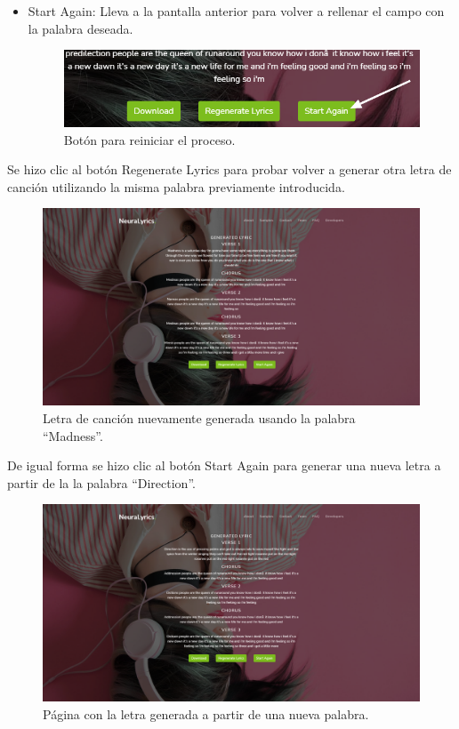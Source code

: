 \documentclass[12pt, a4paper, titlepage]{report}
\begin{document}
\begin{itemize}
	\item Start Again: Lleva a la pantalla anterior para volver a rellenar el campo con la palabra deseada.
	
	\begin{figure}[H] 
		\includegraphics[width=13.5cm]{./imagenes/Pruebas/BotStart.png}
		\centering \caption{Botón para reiniciar el proceso.}
	\end{figure}	
	
\end{itemize}

Se hizo clic al botón Regenerate Lyrics para probar volver a generar otra letra de canción utilizando la misma palabra previamente introducida.

\begin{figure}[H] 
	\includegraphics[width=13.5cm]{./imagenes/Pruebas/Regenerate.png}
	\centering \caption{Letra de canción nuevamente generada usando la palabra ``Madness''.}
\end{figure}

De igual forma se hizo clic al botón Start Again para generar una nueva letra a partir de la la palabra ``Direction''.

\begin{figure}[H] 
	\includegraphics[width=13.5cm]{./imagenes/Pruebas/StartAgain.png}
	\centering \caption{Página con la letra generada a partir de una nueva palabra.}
\end{figure}
\end{document}

